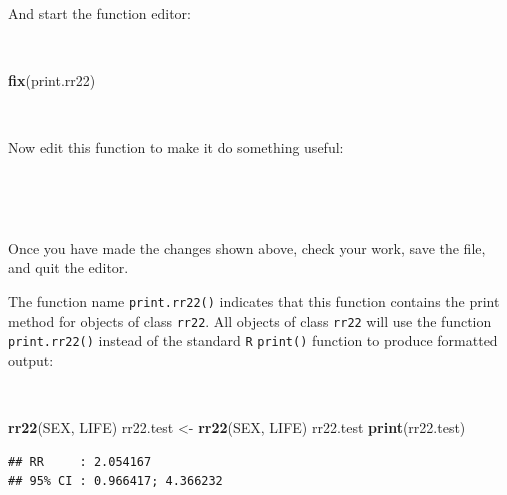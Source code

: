 \documentclass[12pt,a4paper]{book}
\newenvironment{Shaded}{\begin{snugshade}}{\end{snugshade}}
\newcommand{\CharTok}[1]{\textcolor[rgb]{0.31,0.60,0.02}{#1}}
\newcommand{\ControlFlowTok}[1]{\textcolor[rgb]{0.13,0.29,0.53}{\textbf{#1}}}
\newcommand{\DataTypeTok}[1]{\textcolor[rgb]{0.13,0.29,0.53}{#1}}
\newcommand{\DecValTok}[1]{\textcolor[rgb]{0.00,0.00,0.81}{#1}}
\newcommand{\KeywordTok}[1]{\textcolor[rgb]{0.13,0.29,0.53}{\textbf{#1}}}
\newcommand{\NormalTok}[1]{#1}
\newcommand{\OperatorTok}[1]{\textcolor[rgb]{0.81,0.36,0.00}{\textbf{#1}}}
\newcommand{\StringTok}[1]{\textcolor[rgb]{0.31,0.60,0.02}{#1}}
\theoremstyle{definition}
\theoremstyle{definition}
\theoremstyle{definition}
\theoremstyle{remark}
\begin{document}
~

And start the function editor:

~

\begin{Shaded}
\begin{Highlighting}[]
\KeywordTok{fix}\NormalTok{(print.rr22)}
\end{Highlighting}
\end{Shaded}

~

Now edit this function to make it do something useful:

~

\begin{Shaded}
\end{Shaded}

~

Once you have made the changes shown above, check your work, save the
file, and quit the editor.

The function name \texttt{print.rr22()} indicates that this function
contains the print method for objects of class \texttt{rr22}. All
objects of class \texttt{rr22} will use the function
\texttt{print.rr22()} instead of the standard \texttt{R}
\texttt{print()} function to produce formatted output:

~

\begin{Shaded}
\begin{Highlighting}[]
\KeywordTok{rr22}\NormalTok{(SEX, LIFE)}
\NormalTok{rr22.test <-}\StringTok{ }\KeywordTok{rr22}\NormalTok{(SEX, LIFE)}
\NormalTok{rr22.test}
\KeywordTok{print}\NormalTok{(rr22.test)}
\end{Highlighting}
\end{Shaded}

\begin{verbatim}
## RR     : 2.054167
## 95% CI : 0.966417; 4.366232
\end{verbatim}
\end{document}
